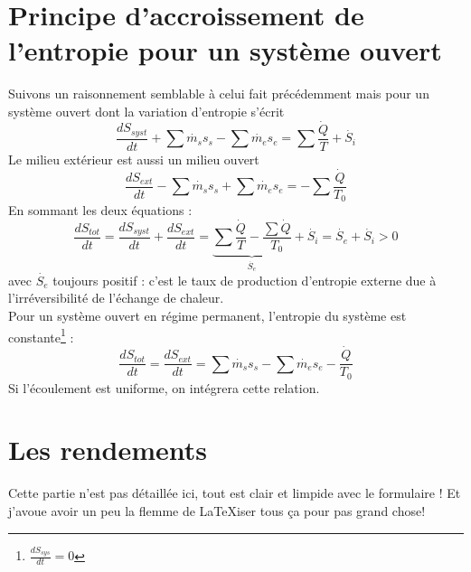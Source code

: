 	\section{Principe d’accroissement de l’entropie pour un système ouvert}
	Suivons un raisonnement semblable à celui fait précédemment mais pour un système 
	ouvert dont la variation d'entropie s'écrit
	\begin{equation}
	\dfrac{dS_{syst}}{dt}+\sum \dot{m_s}s_s - \sum \dot{m_e}s_e = \sum\dfrac{\dot{Q}}{T}+\dot{S_i}
	\end{equation}
	Le milieu extérieur est aussi un milieu ouvert 
	\begin{equation}
	\dfrac{dS_{ext}}{dt}-\sum \dot{m_s}s_s + \sum \dot{m_e}s_e = -\sum\dfrac{\dot{Q}}{T_0}
	\end{equation}
	En sommant les deux équations :
	\begin{equation}
	\dfrac{dS_{tot}}{dt} = \dfrac{dS_{syst}}{dt}+\dfrac{dS_{ext}}{dt} = \underbrace{
	\sum\dfrac{\dot{Q}}{T}-\dfrac{\sum \dot{Q}}{T_0}}_{\dot{S_e}} + \dot{S_i} = \dot{S_e}
	+\dot{S_i} > 0
	\end{equation}
	avec $\dot{S_e}$ toujours positif : c'est le taux de production d'entropie externe due 
	à l'irréversibilité de l'échange de chaleur.\\
	Pour un système ouvert en régime permanent, l’entropie du système est constante\footnote{$\frac{dS_{sys}}{dt}=0$} :
	\begin{equation}
	\dfrac{dS_{tot}}{dt} = \dfrac{dS_{ext}}{dt} = \sum\dot{m_s}s_s-\sum\dot{m_e}s_e - 
	\dfrac{\dot{Q}}{T_0}
	\end{equation}
	Si l'écoulement est uniforme, on intégrera cette relation.
	
	\section{Les rendements}
	Cette partie n'est pas détaillée ici, tout est clair et limpide avec le formulaire ! Et 
	j'avoue avoir un peu la flemme de \LaTeX iser tous ça pour pas grand chose!
	
	
	
